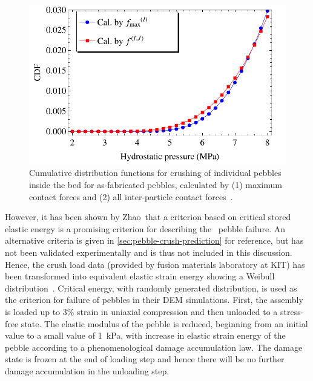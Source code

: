 \begin{figure}[!ht]
  \centering
\includegraphics[width=\singleimagewidth]{figures/Fig-4}
 \caption{Cumulative distribution functions for crushing of individual pebbles inside the bed for as-fabricated pebbles, calculated by (1) maximum contact forces and (2) all inter-particle contact forces~\cite{Gan:2010kc}.}
 \label{fig:cdf_pebbles}
\end{figure}

However, it has been shown by Zhao\etal~that a criterion based on critical stored elastic energy is a promising criterion for describing the \lis~pebble failure.\cite{Zhao2010,Zhao2011} An alternative criteria is given in \cref{sec:pebble-crush-prediction} for reference, but has not been validated experimentally and is thus not included in this discussion. Hence, the crush load data (provided by fusion materials laboratory at KIT) has been transformed into equivalent elastic strain energy showing a Weibull distribution~\cite{Zhao2010}. Critical energy, with randomly generated distribution, is used as the criterion for failure of pebbles in their DEM simulations. First, the assembly is loaded up to 3\% strain in uniaxial compression and then unloaded to a stress-free state. The elastic modulus of the pebble is reduced, beginning from an initial value to a small value of \SI{1}{\kilo\pascal}, with increase in elastic strain energy of the pebble according to a phenomenological damage accumulation law.\cite{Annabattula2012a} The damage state is frozen at the end of loading step and hence there will be no further damage accumulation in the unloading step. 

